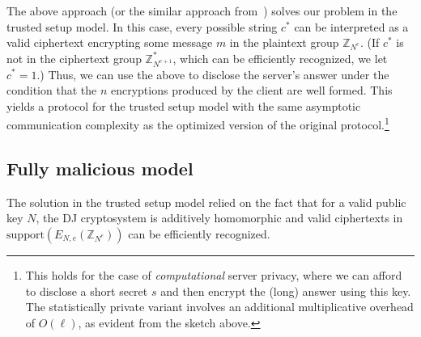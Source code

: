 \documentclass{article}
\newcommand{\encdj}{{E}_{N,e}}
\newcommand{\support}{{\mathrm{support}}}
\newcommand{\Z}{{\mathbb{Z}}}
\begin{document}
The above approach (or the similar approach from~\cite{L05}) solves
our problem in the trusted setup model. In this case, every
possible string $c^*$ can be interpreted as a valid ciphertext
encrypting some message $m$ in the plaintext group $\Z_{N^e}$.
(If $c^*$ is not in the ciphertext group $\Z^*_{N^{e+1}}$, which
can be efficiently recognized, we let $c^*=1$.) Thus, we can use
the above to disclose the server's answer under the condition that
the $n$ encryptions produced by the client are well formed. This
yields a protocol for the trusted setup model
with the same asymptotic communication complexity as the optimized
version of the original protocol.\footnote{This holds for the case
of {\em computational} server privacy, where we can afford to
disclose a short secret $s$ and then encrypt the (long) answer
using this key. The statistically private variant involves an
additional multiplicative overhead of $O(\ell)$, as evident from the sketch above. }

\subsection{Fully malicious model}
\label{sec-fullmalicious}

The solution in the trusted setup model relied on the fact that
for a valid public key $N$, the DJ cryptosystem is additively homomorphic and
valid ciphertexts in $\support(\encdj(\Z_{N^e}))$ can be
efficiently recognized.
\end{document}
